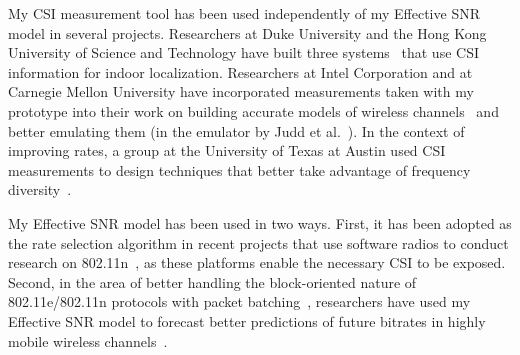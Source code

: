 My CSI measurement tool has been used independently of my Effective SNR model in several projects. Researchers at Duke University and the Hong Kong University of Science and Technology have built three systems~\cite{Sen_PinLoc,Sen_SpinLoc,Wu_FILA} that use CSI information for indoor localization. Researchers at Intel Corporation and at Carnegie Mellon University have incorporated measurements taken with my prototype into their work on building accurate models of wireless channels~\cite{Perahia_Doppler} and better emulating them (in the emulator by Judd et al.~\cite{CMU_Emulator,Judd_Emulator}). In the context of improving rates, a group at the University of Texas at Austin used CSI measurements to design techniques that better take advantage of frequency diversity~\cite{Bhartia_FreqDiv}.

My Effective SNR model has been used in two ways. First, it has been adopted as the rate selection algorithm in recent projects that use software radios to conduct research on 802.11n~\cite{Lin_80211n+}, as these platforms enable the necessary CSI to be exposed. Second, in the area of better handling the block-oriented nature of 802.11e/802.11n protocols with packet batching~\cite{Tie_BlockRate}, researchers have used my Effective SNR model to forecast better predictions of future bitrates in highly mobile wireless channels~\cite{Sen_PhyRate}.

\ifx\mainfile\undefined

\fi
